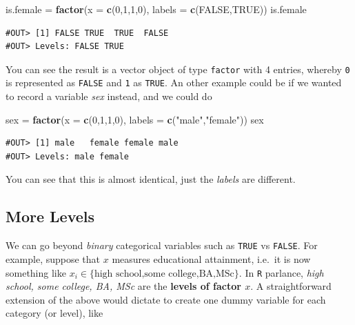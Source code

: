 \documentclass[]{book}
\newenvironment{Shaded}{\begin{snugshade}}{\end{snugshade}}
\newcommand{\DataTypeTok}[1]{\textcolor[rgb]{0.13,0.29,0.53}{#1}}
\newcommand{\DecValTok}[1]{\textcolor[rgb]{0.00,0.00,0.81}{#1}}
\newcommand{\KeywordTok}[1]{\textcolor[rgb]{0.13,0.29,0.53}{\textbf{#1}}}
\newcommand{\NormalTok}[1]{#1}
\newcommand{\OtherTok}[1]{\textcolor[rgb]{0.56,0.35,0.01}{#1}}
\newcommand{\StringTok}[1]{\textcolor[rgb]{0.31,0.60,0.02}{#1}}
\begin{document}
\begin{Shaded}
\begin{Highlighting}[]
\NormalTok{is.female =}\StringTok{ }\KeywordTok{factor}\NormalTok{(}\DataTypeTok{x =} \KeywordTok{c}\NormalTok{(}\DecValTok{0}\NormalTok{,}\DecValTok{1}\NormalTok{,}\DecValTok{1}\NormalTok{,}\DecValTok{0}\NormalTok{), }\DataTypeTok{labels =} \KeywordTok{c}\NormalTok{(}\OtherTok{FALSE}\NormalTok{,}\OtherTok{TRUE}\NormalTok{))}
\NormalTok{is.female}
\end{Highlighting}
\end{Shaded}

\begin{verbatim}
#OUT> [1] FALSE TRUE  TRUE  FALSE
#OUT> Levels: FALSE TRUE
\end{verbatim}

You can see the result is a vector object of type \texttt{factor} with 4 entries, whereby \texttt{0} is represented as \texttt{FALSE} and \texttt{1} as \texttt{TRUE}. An other example could be if we wanted to record a variable \emph{sex} instead, and we could do

\begin{Shaded}
\begin{Highlighting}[]
\NormalTok{sex =}\StringTok{ }\KeywordTok{factor}\NormalTok{(}\DataTypeTok{x =} \KeywordTok{c}\NormalTok{(}\DecValTok{0}\NormalTok{,}\DecValTok{1}\NormalTok{,}\DecValTok{1}\NormalTok{,}\DecValTok{0}\NormalTok{), }\DataTypeTok{labels =} \KeywordTok{c}\NormalTok{(}\StringTok{"male"}\NormalTok{,}\StringTok{"female"}\NormalTok{))}
\NormalTok{sex}
\end{Highlighting}
\end{Shaded}

\begin{verbatim}
#OUT> [1] male   female female male  
#OUT> Levels: male female
\end{verbatim}

You can see that this is almost identical, just the \emph{labels} are different.

\hypertarget{more-levels}{%
\subsection{More Levels}\label{more-levels}}

We can go beyond \emph{binary} categorical variables such as \texttt{TRUE} vs \texttt{FALSE}. For example, suppose that \(x\) measures educational attainment, i.e.~it is now something like \(x_i \in \{\text{high school,some college,BA,MSc}\}\). In \texttt{R} parlance, \emph{high school, some college, BA, MSc} are the \textbf{levels of factor \(x\)}. A straightforward extension of the above would dictate to create one dummy variable for each category (or level), like
\end{document}
